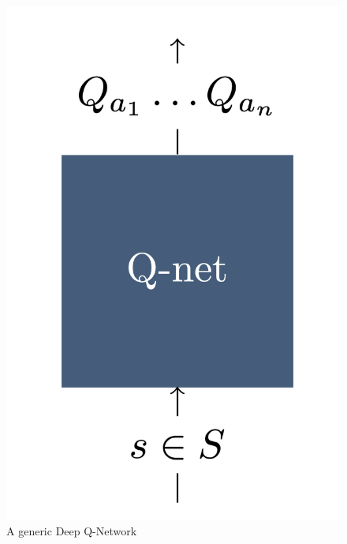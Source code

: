 \documentclass[10pt,twocolumn,letterpaper]{article}
\begin{document}
\begin{figure}[h]
\begin{center}
\includegraphics[scale=0.15]{resources/generalQnetwork.png}
\end{center}
\vspace{-0.2em}
\caption{A generic Deep Q-Network}
\label{fig:genericDQN}
\end{figure}


\end{document}
